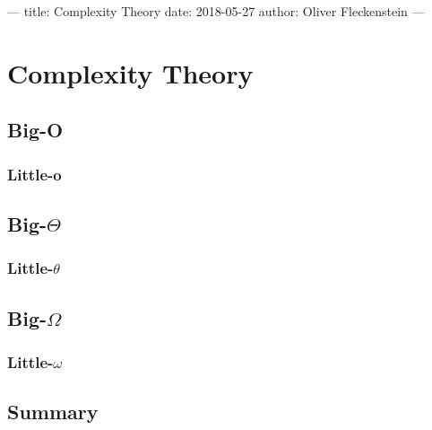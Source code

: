 ---
title: Complexity Theory
date: 2018-05-27
author: Oliver Fleckenstein
---
\chapter{Complexity Theory}



    \section{Big-O}


        \subsection{Little-o}

    \section{Big-$\Theta$}

        \subsection{Little-$\theta$}

    \section{Big-$\Omega$}

        \subsection{Little-$\omega$}

    \section{Summary}
